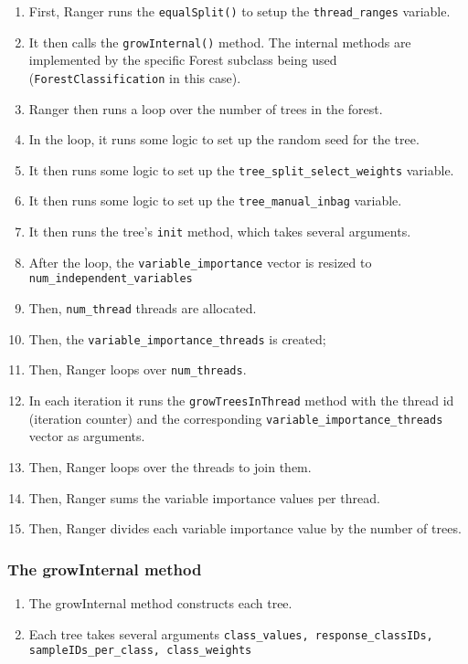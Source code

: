 \documentclass[12pt,oneside]{book}
\begin{document}
\begin{enumerate}
  \item First, Ranger runs the \lstinline|equalSplit()| to setup the \lstinline|thread_ranges| variable.
  \item It then calls the \lstinline|growInternal()| method. The internal methods are implemented by the specific Forest subclass being used (\lstinline|ForestClassification| in this case).
  \item Ranger then runs a loop over the number of trees in the forest.
  \item In the loop, it runs some logic to set up the random seed for the tree.
  \item It then runs some logic to set up the \lstinline|tree_split_select_weights| variable.
  \item It then runs some logic to set up the \lstinline|tree_manual_inbag| variable.
  \item It then runs the tree's \lstinline|init| method, which takes several arguments.
  \item After the loop, the \lstinline|variable_importance| vector is resized to \lstinline|num_independent_variables|
  \item Then, \lstinline|num_thread| threads are allocated.
  \item Then, the \lstinline|variable_importance_threads| is created;
  \item Then, Ranger loops over \lstinline|num_threads|.
  \item In each iteration it runs the \lstinline|growTreesInThread| method with the thread id (iteration counter) and the corresponding \lstinline|variable_importance_threads| vector as arguments.
  \item Then, Ranger loops over the threads to join them.
  \item Then, Ranger sums the variable importance values per thread.
  \item Then, Ranger divides each variable importance value by the number of trees.
\end{enumerate}

\subsubsection{The growInternal method}

\begin{enumerate}
  \item The growInternal method constructs each tree.
  \item Each tree takes several arguments \lstinline|class_values, response_classIDs, sampleIDs_per_class, class_weights|
\end{enumerate}
\end{document}

